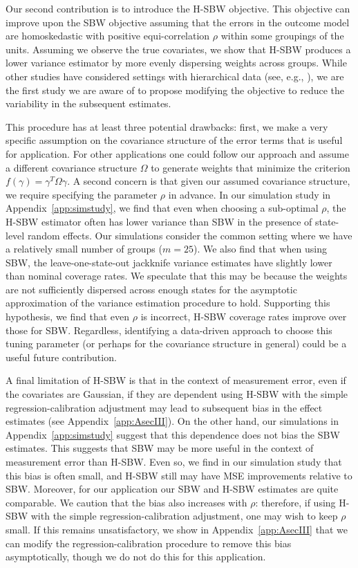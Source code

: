 \documentclass[aoas]{imsart}
\theoremstyle{plain}
\theoremstyle{remark}
\begin{document}
Our second contribution is to introduce the H-SBW objective. This objective can improve upon the SBW objective assuming that the errors in the outcome model are homoskedastic with positive equi-correlation $\rho$ within some groupings of the units. Assuming we observe the true covariates, we show that H-SBW produces a lower variance estimator by more evenly dispersing weights across groups. While other studies have considered settings with hierarchical data (see, e.g., \cite{keele2020hospital}), we are the first study we are aware of to propose modifying the objective to reduce the variability in the subsequent estimates.

This procedure has at least three potential drawbacks: first, we make a very specific assumption on the covariance structure of the error terms that is useful for application. For other applications one could follow our approach and assume a different covariance structure $\Omega$ to generate weights that minimize the criterion $f(\gamma) = \gamma^T\Omega\gamma$. A second concern is that given our assumed covariance structure, we require specifying the parameter $\rho$ in advance. In our simulation study in Appendix~\ref{app:simstudy}, we find that even when choosing a sub-optimal $\rho$, the H-SBW estimator often has lower variance than SBW in the presence of state-level random effects. Our simulations consider the common setting where we have a relatively small number of groups ($m = 25$). We also find that when using SBW, the leave-one-state-out jackknife variance estimates have slightly lower than nominal coverage rates. We speculate that this may be because the weights are not sufficiently dispersed across enough states for the asymptotic approximation of the variance estimation procedure to hold. Supporting this hypothesis, we find that even $\rho$ is incorrect, H-SBW coverage rates improve over those for SBW. Regardless, identifying a data-driven approach to choose this tuning parameter (or perhaps for the covariance structure in general) could be a useful future contribution.

A final limitation of H-SBW is that in the context of measurement error, even if the covariates are Gaussian, if they are dependent using H-SBW with the simple regression-calibration adjustment may lead to subsequent bias in the effect estimates (see Appendix~\ref{app:AsecIII}). On the other hand, our simulations in Appendix~\ref{app:simstudy} suggest that this dependence does not bias the SBW estimates. This suggests that SBW may be more useful in the context of measurement error than H-SBW. Even so, we find in our simulation study that this bias is often small, and H-SBW still may have MSE improvements relative to SBW. Moreover, for our application our SBW and H-SBW estimates are quite comparable. We caution that the bias also increases with $\rho$: therefore, if using H-SBW with the simple regression-calibration adjustment, one may wish to keep $\rho$ small. If this remains unsatisfactory, we show in Appendix~\ref{app:AsecIII} that we can modify the regression-calibration procedure to remove this bias asymptotically, though we do not do this for this application.
\end{document}
